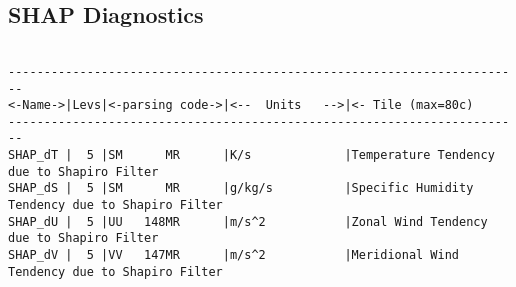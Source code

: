 
\subsection{SHAP Diagnostics}
\label{sec:pkg:shap_filt:diagnostics}

\begin{verbatim}

------------------------------------------------------------------------
<-Name->|Levs|<-parsing code->|<--  Units   -->|<- Tile (max=80c) 
------------------------------------------------------------------------
SHAP_dT |  5 |SM      MR      |K/s             |Temperature Tendency due to Shapiro Filter
SHAP_dS |  5 |SM      MR      |g/kg/s          |Specific Humidity Tendency due to Shapiro Filter
SHAP_dU |  5 |UU   148MR      |m/s^2           |Zonal Wind Tendency due to Shapiro Filter
SHAP_dV |  5 |VV   147MR      |m/s^2           |Meridional Wind Tendency due to Shapiro Filter
\end{verbatim}
